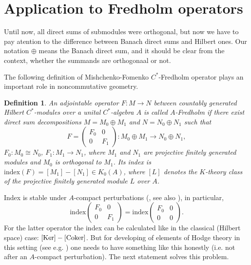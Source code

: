 \documentclass[12pt]{amsart}
\newtheorem{dfn}[teo]{Definition}
\newcommand{\Ker}{\operatorname{Ker}}
\def\Ker{\mathop{\rm Ker}\nolimits}
\begin{document}
\section{Application to Fredholm operators}

Until now, all direct sums of submodules were orthogonal, but now we have to pay atention to the difference between Banach direct sums and Hilbert ones. Our notation $\oplus$ means the Banach direct sum, and it should be clear from the context, whether the summands are orthogonaal or not.

The following definition of Mishchenko-Fomenko $C^*$-Fredholm operator \cite{MF} plays an important role in noncommutative geometry.  
\begin{dfn}
\rm
An adjointable operator $F:M \to N$ between countably generated Hilbert $C^*$-modules over a unital
$C^*$-algebra $A$ is called $A$-\emph{Fredholm} if there exist direct sum decompositions 
${M}={M}_0 \oplus {M}_1$ and
${N}={N}_0 \oplus {N}_1$ such that 
\begin{equation}\label{summa}
F=
\left(\begin{matrix}
		F_0&0\\
		0& F_1
	\end{matrix}\right): 
{M}_0 \oplus {M}_1   \to   {N}_0 \oplus {N}_1,
\end{equation}
$F_0: {M}_0 \cong {N}_0$, $F_1:{M}_1 \to {N}_1$,
where
${M}_1$ and ${N}_1$ are projective finitely generated
modules and $M_0$ is orthogonal to $M_1$. 
Its \emph{index} is $\mathrm{index}(F)=[M_1]-[N_1]\in K_0(A)$, where $[L]$ denotes the $K$-theory class of the projective finitely generated module $L$ over $A$.
\end{dfn}

Index is stable under $A$-compact perturbations (\cite{MF}, see also \cite{MTBook}), in particular, 
$$
\mathrm{index} \left(\begin{matrix}
		F_0&0\\
		0& F_1
	\end{matrix}\right)
= \mathrm{index} \left(\begin{matrix}
		F_0&0\\
		0& 0
	\end{matrix}\right).
$$ 
For the latter operator the index can be calculated like in the classical (Hilbert space) case:
$[\Ker ] - [\mathrm{Coker}]$. But for developing of elements of Hodge theory in this setting
(see e.g. \cite{FrTroFA}) one needs to have something like this honestly (i.e. not after an $A$-compact
perturbation). The next statement solves this problem.
\end{document}
